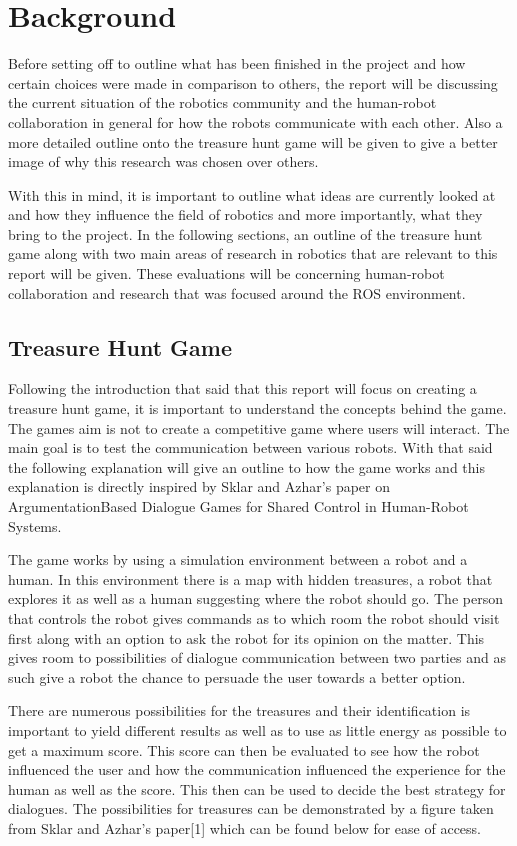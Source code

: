 \documentclass{report}
\begin{document}
  \chapter{Background}
    Before setting off to outline what has been finished in the project and how certain choices were made in comparison to others, the report will be discussing the current situation of the robotics community and the human-robot collaboration in general for how the robots communicate with each other. Also a more detailed outline onto the treasure hunt game will be given to give a better image of why this research was chosen over others.

    With this in mind, it is important to outline what ideas are currently looked at and how they influence the field of robotics and more importantly, what they bring to the project. In the following sections, an outline of the treasure hunt game along with two main areas of research in robotics that are relevant to this report will be given. These evaluations will be concerning human-robot collaboration and research that was focused around the ROS environment.

    \section{Treasure Hunt Game}
      Following the introduction that said that this report will focus on creating a treasure hunt game, it is important to understand the concepts behind the game. The games aim is not to create a competitive game where users will interact. The main goal is to test the communication between various robots. With that said the following explanation will give an outline to how the game works and this explanation is directly inspired by Sklar and Azhar’s paper on ArgumentationBased Dialogue Games for Shared Control in Human-Robot Systems.

      The game works by using a simulation environment between a robot and a human. In this environment there is a map with hidden treasures, a robot that explores it as well as a human suggesting where the robot should go. The person that controls the robot gives commands as to which room the robot should visit first along with an option to ask the robot for its opinion on the matter. This gives room to possibilities of dialogue communication between two parties and as such give a robot the chance to persuade the user towards a better option.

      There are numerous possibilities for the treasures and their identification is important to yield different results as well as to use as little energy as possible to get a maximum score. This score can then be evaluated to see how the robot influenced the user and how the communication influenced the experience for the human as well as the score. This then can be used to decide the best strategy for dialogues. The possibilities for treasures can be demonstrated by a figure taken from Sklar and Azhar’s paper[1] which can be found below for ease of access.
\end{document}
